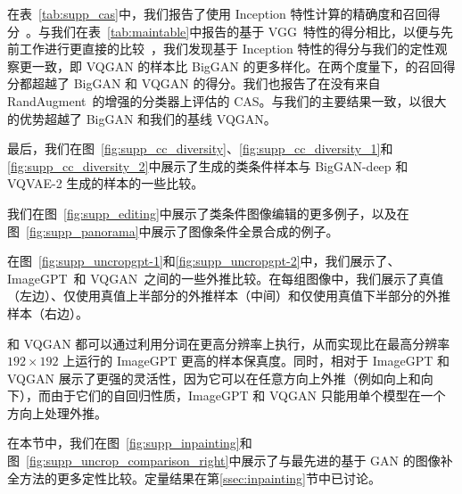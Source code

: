 在表~\ref{tab:supp_cas}中，我们报告了使用 Inception 特性计算的精确度和召回得分~\cite{christian16inception}。与我们在表~\ref{tab:maintable}中报告的基于 VGG~\cite{simonyan2015vgg}特性的得分相比，以便与先前工作进行更直接的比较~\cite{KynkaanniemiKLL19,dhariwal2021diffusion}，我们发现基于 Inception 特性的得分与我们的定性观察更一致，即 VQGAN 的样本比 BigGAN 的更多样化。在两个度量下，\model 的召回得分都超越了 BigGAN 和 VQGAN 的得分。我们也报告了在没有来自 RandAugment~\cite{cubuk2019randaugment}的增强的分类器上评估的 CAS。与我们的主要结果一致，\model 以很大的优势超越了 BigGAN 和我们的基线 VQGAN。

最后，我们在图~\ref{fig:supp_cc_diversity}、\ref{fig:supp_cc_diversity_1}和\ref{fig:supp_cc_diversity_2}中展示了\model 生成的类条件样本与 BigGAN-deep 和 VQVAE-2 生成的样本的一些比较。





\label{sec:supp_image_editing}




我们在图~\ref{fig:supp_editing}中展示了类条件图像编辑的更多例子，以及在图~\ref{fig:supp_panorama}中展示了图像条件全景合成的例子。 

\label{sec:supp_outpainting_comparison_with_transformers}
在图~\ref{fig:supp_uncropgpt-1}和\ref{fig:supp_uncropgpt-2}中，我们展示了\model 、ImageGPT~\cite{chen2020imagegpt}和 VQGAN~\cite{Esser21vqgan}之间的一些外推比较。在每组图像中，我们展示了真值（左边）、仅使用真值上半部分的外推样本（中间）和仅使用真值下半部分的外推样本（右边）。

\model 和 VQGAN 都可以通过利用分词在更高分辨率上执行，从而实现比在最高分辨率 $192\times192$ 上运行的 ImageGPT 更高的样本保真度。同时，\model 相对于 ImageGPT 和 VQGAN 展示了更强的灵活性，因为它可以在任意方向上外推（例如向上和向下），而由于它们的自回归性质，ImageGPT 和 VQGAN 只能用单个模型在一个方向上处理外推。




\label{sec:supp_inpainting_and_outpainting_comparison_with_gans}

在本节中，我们在图~\ref{fig:supp_inpainting}和图~\ref{fig:supp_uncrop_comparison_right}中展示了与最先进的基于 GAN 的图像补全方法的更多定性比较。定量结果在第\ref{ssec:inpainting}节中已讨论。

